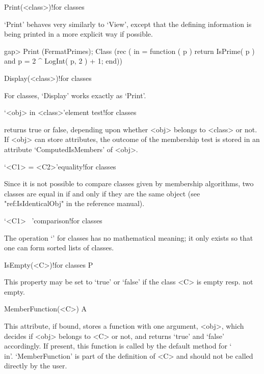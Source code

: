 \>Print(<class>)!{for classes}

`Print' behaves very similarly to `View', except that the defining
information is being printed in a more explicit way if possible.

\begintt
gap> Print (FermatPrimes);
Class (rec ( in = function ( p )
    return IsPrime( p ) and p = 2 ^ LogInt( p, 2 ) + 1;
end))
\endtt


\>Display(<class>)!{for classes}

For classes, `Display' works exactly as `Print'.

\>`<obj> in <class>'{element test}!{for classes}

% 
%
returns true or false, depending upon whether <obj> belongs to <class> or
not. If <obj> can store attributes, the outcome of the membership test is
stored in an attribute `ComputedIsMembers' of <obj>.

\>`<C1> = <C2>'{equality!for classes}

Since it is not possible to compare classes given by membership algorithms,
two classes are equal in {\GAP} if and only if they are the same {\GAP}
object (see "ref:IsIdenticalObj" in the {\GAP} reference manual).

\>`<C1> \<\ <C2>'{comparison!for classes}

The operation `\<' for classes has no mathematical meaning; it only exists
so that one can form sorted lists of classes.


\null


\>IsEmpty(<C>)!{for classes} P

This property may be set to `true' or `false' if the class <C> is empty
resp. not empty.

\>MemberFunction(<C>) A

This attribute, if bound, stores a function with one argument, <obj>,
which decides if <obj> belongs to <C> or not, and returns `true' and `false' accordingly.
If present, this function is called by the default method for `\\in'.
`MemberFunction' is part of the definition of <C> and should not be called 
directly by the user.



\null

